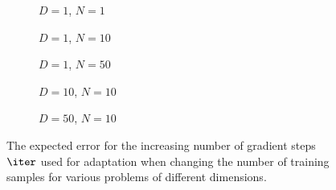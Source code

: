 \begin{figure}[h!]
  \centering
    \begin{subfigure}{0.3\textwidth}
      \centering
      \caption{$D=1$, $N=1$}
      \label{fig:linear-n_iter-N-1-D-1}
    \end{subfigure}
    \begin{subfigure}{0.3\textwidth}
      \centering
      \caption{$D=1$, $N=10$}
      \label{fig:linear-n_iter-N-10-D-1}
    \end{subfigure}
    \begin{subfigure}{0.3\textwidth}
      \centering
      \caption{$D=1$, $N=50$}
      \label{fig:linear-n_iter-N-50-D-1}
    \end{subfigure}

    \begin{subfigure}{0.3\textwidth}
      \centering
      \caption{$D=10$, $N=10$}
      \label{fig:linear-n_iter-N-10-D-10}
    \end{subfigure}
    \begin{subfigure}{0.3\textwidth}
      \centering
      \caption{$D=50$, $N=10$}
      \label{fig:linear-n_iter-N-10-D-50}
    \end{subfigure}  

  \caption{The expected error for the increasing number of gradient steps $\iter$ used for adaptation when changing the number of training samples for various problems of different dimensions.}
  \label{fig:linear-n_iter}
\end{figure}


